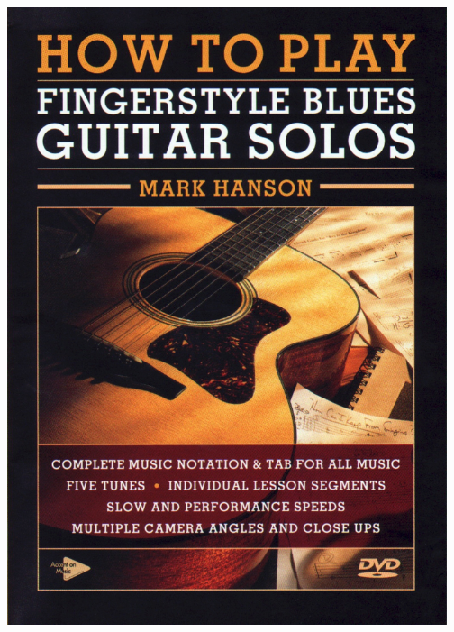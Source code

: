 \documentclass[a4paper]{book}
\begin{document}
\begin{center}
\includegraphics[width=12.929cm,height=18.122cm]{lebluessupportsmethodes-img101.jpg}
\end{center}







\clearpage
\end{document}
